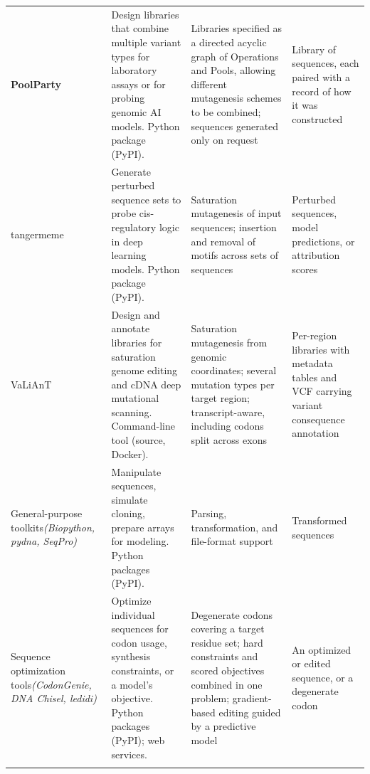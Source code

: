 \begin{table}[tbp]
\begin{tabular}{@{}>{\raggedright\arraybackslash}p{2.0cm}>{\raggedright\arraybackslash}p{3.4cm}>{\raggedright\arraybackslash}p{4.3cm}>{\raggedright\arraybackslash}p{2.15cm}@{}}
\textbf{PoolParty} &
Design libraries that combine multiple variant types for laboratory assays or for probing genomic AI models. Python package (PyPI). &
Libraries specified as a directed acyclic graph of Operations and Pools, allowing different mutagenesis schemes to be combined; sequences generated only on request &
Library of sequences, each paired with a record of how it was constructed\\
\addlinespace

tangermeme \citep{Schreiber2025nd} &
Generate perturbed sequence sets to probe cis-regulatory logic in deep learning models. Python package (PyPI). &
Saturation mutagenesis of input sequences; insertion and removal of motifs across sets of sequences &
Perturbed sequences, model predictions, or attribution scores\\
\addlinespace

VaLiAnT \citep{Barbon2022th} &
Design and annotate libraries for saturation genome editing and cDNA deep mutational scanning. Command-line tool (source, Docker). &
Saturation mutagenesis from genomic coordinates; several mutation types per target region; transcript-aware, including codons split across exons &
Per-region libraries with metadata tables and VCF carrying variant consequence annotation\\
\midrule

General-purpose toolkits\newline\textit{(Biopython, pydna, SeqPro)} \citep{Cock2009df,Pereira2015wj,Klie2023kg} &
Manipulate sequences, simulate cloning, prepare arrays for modeling. Python packages (PyPI). &
Parsing, transformation, and file-format support &
Transformed sequences\\
\addlinespace

Sequence optimization tools\newline\textit{(CodonGenie, DNA Chisel, ledidi)} \citep{Swainston2017rb,Zulkower2020jk,Schreiber2025ledidi} &
Optimize individual sequences for codon usage, synthesis constraints, or a model's objective. Python packages (PyPI); web services. &
Degenerate codons covering a target residue set; hard constraints and scored objectives combined in one problem; gradient-based editing guided by a predictive model &
An optimized or edited sequence, or a degenerate codon\\
\botrule
\end{tabular}
\end{table}


\clearpage

